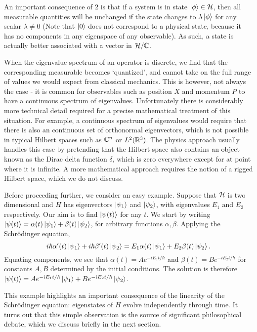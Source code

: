 \documentclass[a4paper]{article}
\begin{document}
An important consequence of $2$ is that if a system is in state $\left\lvert \phi \right\rangle \in \mathcal{H}$, then all measurable quantities will be unchanged if the state changes to $\lambda\left\lvert \phi \right\rangle$ for any scalar $\lambda \neq 0$ (Note that $\left\lvert 0 \right\rangle$ does not correspond to a physical state, because it has no components in any eigenspace of any observable). As such, a state is actually better associated with a vector in $\mathcal{H} / \mathbb{C}$.

When the eigenvalue spectrum of an operator is discrete, we find that the corresponding measurable becomes `quantized', and cannot take on the full range of values we would expect from classical mechanics. This is however, not always the case - it is common for observables such as position $X$ and momentum $P$ to have a continuous spectrum of eigenvalues. Unfortunately there is considerably more technical detail required for a precise mathematical treatment of this situation. For example, a continuous spectrum of eigenvalues would require that there is also an continuous set of orthonormal eigenvectors, which is not possible in typical Hilbert spaces such as $\mathbb{C}^n$ or $L^2(\mathbb{R}^3)$. The physics approach usually handles this case by pretending that the Hilbert space also contains an object known as the Dirac delta function $\delta$, which is zero everywhere except for at point where it is infinite. A more mathematical approach requires the notion of a rigged Hilbert space, which we do not discuss.

Before proceeding further, we consider an easy example. Suppose that $\mathcal{H}$ is two dimensional and $H$ has eigenvectors $\left\lvert \psi_1 \right\rangle$ and $\left\lvert \psi_2 \right\rangle$, with eigenvalues $E_1$ and $E_2$ respectively. Our aim is to find $\left\lvert \psi(t) \right\rangle$ for any $t$. We start by writing $\left\lvert \psi(t) \right\rangle = \alpha(t) \left\lvert \psi_1 \right\rangle + \beta(t) \left\lvert \psi_2 \right\rangle$, for arbitrary functions $\alpha, \beta$. Applying the Schr\"{o}dinger equation, 
$$i\hbar \alpha'(t) \left\lvert \psi_1 \right\rangle + i\hbar \beta'(t) \left\lvert \psi_2 \right\rangle = E_1 \alpha(t) \left\lvert \psi_1 \right\rangle + E_2 \beta(t) \left\lvert \psi_2 \right\rangle.$$
Equating components, we see that $\alpha(t) = Ae^{-iE_1t/\hbar}$ and $\beta(t) = Be^{-iE_2t/\hbar}$ for constants $A, B$ determined by the initial conditions. The solution is therefore $\left\lvert \psi(t) \right\rangle = Ae^{-iE_1t/\hbar}\left\lvert \psi_1 \right\rangle + Be^{-iE_2t/\hbar}\left\lvert \psi_2 \right\rangle$. 

This example highlights an important consequence of the linearity of the Schr\"{o}dinger equation: eigenstates of $H$ evolve independently through time. It turns out that this simple observation is the source of significant philosophical debate, which we discuss briefly in the next section.
\end{document}
